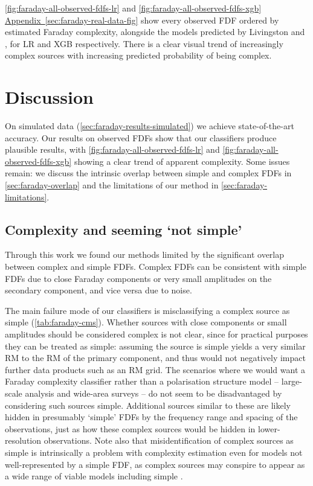 \documentclass[11pt, a4paper]{book}
\newcommand{\aref}[1]{\hyperref[#1]{Appendix~\ref{#1}}}
\providecommand{\DIFaddtex}[1]{{\protect\color{blue}\uwave{#1}}} %
\providecommand{\DIFaddbegin}{} %
\providecommand{\DIFaddend}{} %
\providecommand{\DIFadd}[1]{\texorpdfstring{\DIFaddtex{#1}}{#1}} %
\newcommand{\DIFaddincludegraphics}[2][]{{\color{blue}\fbox{\DIFOincludegraphics[#1]{#2}}}} %
\DeclareRobustCommand{\DIFaddbegin}{\DIFOaddbegin \let\includegraphics\DIFaddincludegraphics} %
\DeclareRobustCommand{\DIFaddend}{\DIFOaddend \let\includegraphics\DIFOincludegraphics} %
\begin{document}
    \autoref{fig:faraday-all-observed-fdfs-lr} and \autoref{fig:faraday-all-observed-fdfs-xgb} \DIFaddbegin \DIFadd{in }\aref{sec:faraday-real-data-fig} \DIFaddend show every observed FDF ordered by estimated Faraday complexity, alongside the models predicted by Livingston and \citet{osullivan_broad-band_2017}, for LR and XGB respectively. There is a clear visual trend of increasingly complex sources with increasing predicted probability of being complex.

\section{Discussion}
\label{sec:faraday-discussion}

  On simulated data (\autoref{sec:faraday-results-simulated}) we achieve state-of-the-art accuracy. Our results on observed FDFs show that our classifiers produce plausible results, with \autoref{fig:faraday-all-observed-fdfs-lr} and \autoref{fig:faraday-all-observed-fdfs-xgb} showing a clear trend of apparent complexity. Some issues remain: we discuss the intrinsic overlap between simple and complex FDFs in \autoref{sec:faraday-overlap} and the limitations of our method in \autoref{sec:faraday-limitations}.

  \subsection{Complexity and seeming `not simple'}
  \label{sec:faraday-overlap}

    Through this work we found our methods limited by the significant overlap between complex and simple FDFs. Complex FDFs can be consistent with simple FDFs due to close Faraday components or very small amplitudes on the secondary component, and vice versa due to noise.

    The main failure mode of our classifiers is misclassifying a complex source as simple (\autoref{tab:faraday-cms}). Whether sources with close components or small amplitudes should be considered complex is not clear, since for practical purposes they can be treated as simple: assuming the source is simple yields a very similar RM to the RM of the primary component, and thus would not negatively impact further data products such as an RM grid. The scenarios where we would want a Faraday complexity classifier rather than a polarisation structure model -- large-scale analysis and wide-area surveys -- do not seem to be disadvantaged by considering such sources simple. Additional sources similar to these are likely hidden in presumably `simple' FDFs by the frequency range and spacing of the observations, just as how these complex sources would be hidden in lower-resolution observations. Note also that misidentification of complex sources as simple is intrinsically a problem with complexity estimation even for models not well-represented by a simple FDF, as complex sources may conspire to appear as a wide range of viable models including simple \citep{sun15comparison}.
\end{document}
